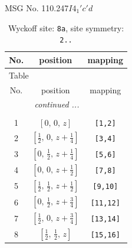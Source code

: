 \documentclass[fleqn,8pt]{jsarticle}
\begin{document}
\setcounter{MaxMatrixCols}{32}

\renewcommand{\tablename}{Table~}
\renewcommand{\figurename}{Figure~}
\begin{center}
\LARGE
MSG No. 110.247\quad$I4_{1}'c'd$
\end{center}
\renewcommand{\arraystretch}{1.2}
\begin{longtable}{ccc}
\caption{Wyckoff site: {\tt 8a}, site symmetry: {\tt 2..}}
 \\
 \hline \hline
No. & position & mapping \\ \hline \endfirsthead

\multicolumn{2}{l}{\tablename\ \thetable{}} \\
 \hline \hline
No. & position & mapping \\ \hline \endhead

 \hline \hline
\multicolumn{2}{r}{\footnotesize\it continued ...} \\ \endfoot

 \hline \hline
\multicolumn{2}{r}{} \\ \endlastfoot

1 & $\left[ 0,\, 0,\, z \right]$ & {\tt [1,2]} \\ \hline
2 & $\left[ \frac{1}{2},\, 0,\, z + \frac{1}{4} \right]$ & {\tt [3,4]} \\ \hline
3 & $\left[ 0,\, \frac{1}{2},\, z + \frac{1}{4} \right]$ & {\tt [5,6]} \\ \hline
4 & $\left[ 0,\, 0,\, z + \frac{1}{2} \right]$ & {\tt [7,8]} \\ \hline
5 & $\left[ \frac{1}{2},\, \frac{1}{2},\, z + \frac{1}{2} \right]$ & {\tt [9,10]} \\ \hline
6 & $\left[ 0,\, \frac{1}{2},\, z + \frac{3}{4} \right]$ & {\tt [11,12]} \\ \hline
7 & $\left[ \frac{1}{2},\, 0,\, z + \frac{3}{4} \right]$ & {\tt [13,14]} \\ \hline
8 & $\left[ \frac{1}{2},\, \frac{1}{2},\, z \right]$ & {\tt [15,16]} \\
\end{longtable}
\renewcommand{\arraystretch}{1.2}
\end{document}
